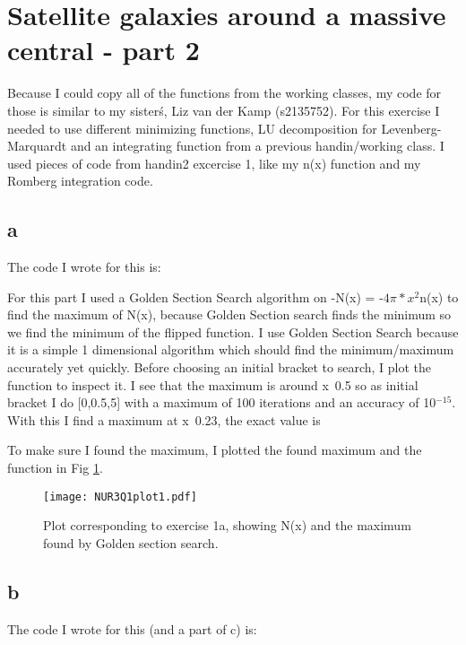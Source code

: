 \section{Satellite galaxies around a massive central - part 2}

Because I could copy all of the functions from the working classes, 
my code for those is similar to my sister\'s, Liz van der Kamp (s2135752). 
For this exercise I needed to use different minimizing functions, LU decomposition for Levenberg-Marquardt
and an integrating function from a previous handin/working class.
I used pieces of code from handin2 excercise 1, like my n(x) function and my Romberg integration code.


\subsection*{a}

The code I wrote for this is:


For this part I used a Golden Section Search algorithm on -N(x) = -$4\pi *x^2$n(x) to find the maximum of N(x),
because Golden Section search finds the minimum so we find the minimum of the flipped function. I use Golden Section
Search because it is a simple 1 dimensional algorithm which should find the minimum/maximum accurately yet quickly.
Before choosing an initial bracket to search, I plot the function to inspect it. I see that the maximum is around 
x~0.5 so as initial bracket I do [0,0.5,5] with a maximum of 100 iterations and an accuracy of 10$^{-15}$. 
With this I find a maximum at x~0.23, the exact value is


To make sure I found the maximum, I plotted the found maximum and the function in Fig \ref{fig:fig1}.
\begin{figure}[h!]
  \centering
  \texttt{[image: NUR3Q1plot1.pdf]}
  \caption{Plot corresponding to exercise 1a, showing  N(x) and the maximum found by Golden section search.}
  \label{fig:fig1}
\end{figure} 


\subsection*{b}

The code I wrote for this (and a part of c) is:



